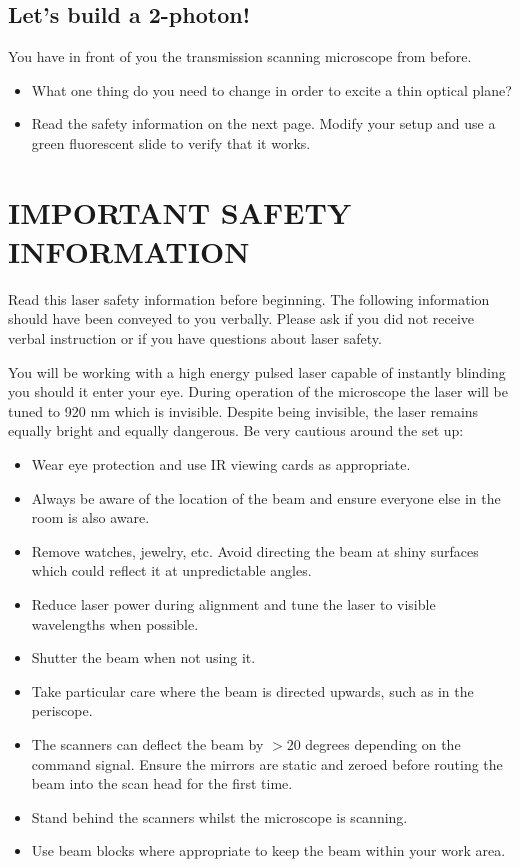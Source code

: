 \documentclass[a4paper]{report}
\begin{document}
\subsection{Let's build a 2-photon!}
You have in front of you the transmission scanning microscope from before. 
\begin{itemize}
    \item What one thing do you need to change in order to excite a thin optical plane?
    \item Read the safety information on the next page. Modify your setup and use a green fluorescent slide to verify that it works. 
\end{itemize}


\clearpage
\section{IMPORTANT SAFETY INFORMATION}
Read this laser safety information before beginning. 
The following information should have been conveyed to you verbally. 
Please ask if you did not receive verbal instruction or if you have questions about laser safety. 

You will be working with a high energy pulsed laser capable of instantly blinding you should it enter your eye. 
During operation of the microscope the laser will be tuned to 920 nm which is invisible. 
Despite being invisible, the laser remains equally bright and equally dangerous.
Be very cautious around the set up:

\begin{itemize}
    \item Wear eye protection and use IR viewing cards as appropriate.
    \item Always be aware of the location of the beam and ensure everyone else in the room is also aware.
    \item Remove watches, jewelry, etc. Avoid directing the beam at shiny surfaces which could reflect it at unpredictable angles.
    \item Reduce laser power during alignment and tune the laser to visible wavelengths when possible.
    \item Shutter the beam when not using it. 
    \item Take particular care where the beam is directed upwards, such as in the periscope. 
    \item The scanners can deflect the beam by $>20$ degrees depending on the command signal. Ensure the mirrors are static and zeroed before routing the beam into the scan head for the first time. 
    \item Stand behind the scanners whilst the microscope is scanning.
    \item Use beam blocks where appropriate to keep the beam within your work area.
\end{itemize}
\end{document}
